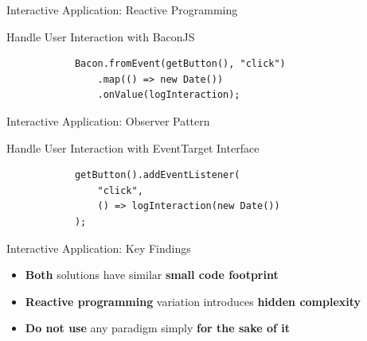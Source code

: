 \documentclass{beamer}
\begin{document}

\begin{frame}[fragile=singleslide]{Interactive Application: Reactive Programming}
	\begin{block}{Handle User Interaction with BaconJS}
		\begin{verbatim}
			Bacon.fromEvent(getButton(), "click")
				.map(() => new Date())
				.onValue(logInteraction);
		\end{verbatim}
	\end{block}
\end{frame}


\begin{frame}[fragile=singleslide]{Interactive Application: Observer Pattern}
	\begin{block}{Handle User Interaction with EventTarget Interface}
		\begin{verbatim}
			getButton().addEventListener(
				"click",
				() => logInteraction(new Date())
			);
		\end{verbatim}
	\end{block}
\end{frame}


\begin{frame}{Interactive Application: Key Findings}
	\begin{itemize}
		\item \textbf{Both} solutions have similar \textbf{small code footprint}\bigskip
		\item \textbf{Reactive programming} variation introduces \textbf{hidden complexity}\bigskip
		\item \textbf{Do not use} any paradigm simply \textbf{for the sake of it}
	\end{itemize}
\end{frame}
\end{document}
